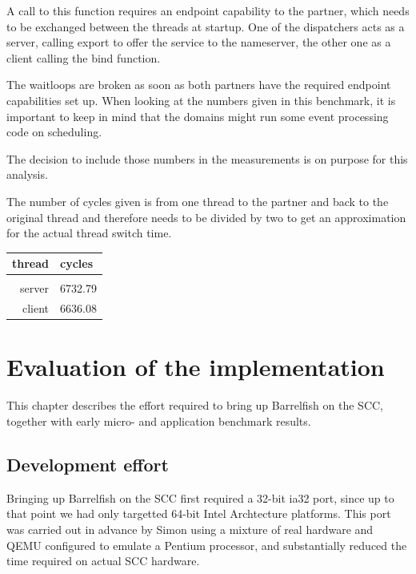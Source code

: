\documentclass[a4paper,twoside]{report} %
\begin{document}
A call to this function requires an endpoint capability to the
partner, which needs to be exchanged between the threads at
startup. One of the dispatchers acts as a server, calling export to
offer the service to the nameserver, the other one as a client calling
the bind function.

The waitloops are broken as soon as both partners have the required
endpoint capabilities set up. When looking at the numbers given in
this benchmark, it is important to keep in mind that the domains might
run some event processing code on scheduling.

The decision to include those numbers in the measurements is on
purpose for this analysis.

The number of cycles given is from one thread to the partner and back
to the original thread and therefore needs to be divided by two to get
an approximation for the actual thread switch time.

\begin{center}
\begin{tabular}{rl}
thread & cycles \\
\hline \\
server & 6732.79\\
client & 6636.08\\
\end{tabular}
\end{center}


\chapter{Evaluation of the implementation}\label{chap:eval}

This chapter describes the effort required to bring up Barrelfish on
the SCC, together with early micro- and application benchmark
results. 

\section{Development effort}

Bringing up Barrelfish on the SCC first required a 32-bit ia32 port,
since up to that point we had only targetted 64-bit Intel Archtecture
platforms.  This port was carried out in advance by Simon using a
mixture of real hardware and QEMU configured to emulate a Pentium
processor, and substantially reduced the time required on actual SCC
hardware. 
\end{document}
